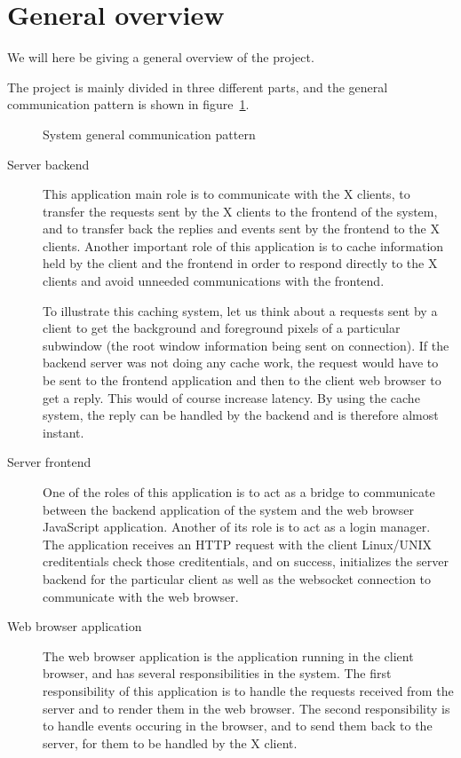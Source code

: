 \section{General overview}
We will here be giving a general overview of the project. 

The project is mainly divided in three different parts, and the general 
communication pattern is shown in figure~\ref{fig:project-overview}.
\begin{figure}[tb]
  \begin{center}
    
    \caption{\label{fig:project-overview}System general communication pattern}
  \end{center}
\end{figure}
\begin{description}
\item[Server backend]
  This application main role is to communicate with the X clients, 
  to transfer the requests sent by the X clients to the frontend of the system, 
  and to transfer back the replies and events sent by the frontend to the 
  X clients. 
% 
  Another important role of this application is to cache 
  information held by the client and the frontend in order to 
  respond directly to the X clients and avoid unneeded communications
  with the frontend.

%
  To illustrate this caching system, let us think about a requests sent by a 
  client to get the background and foreground pixels of a particular 
  subwindow (the root window information being sent on connection). If the 
  backend server was not doing any cache work, the request would have to be 
  sent to the frontend application and then to the client web browser to get 
  a reply. This would of course increase latency. By using the cache system,
  the reply can be handled by the backend and is therefore almost instant.
  
\item[Server frontend]
  One of the roles of this application  is to act as a bridge to
  communicate between the backend application of the system 
  and the web browser JavaScript application.
%
  Another of its role is to act as a login manager. The application 
  receives an HTTP request with the client Linux/UNIX creditentials 
  check those creditentials, and on success, initializes the server 
  backend for the particular client as well as the websocket connection 
  to communicate with the web browser.
\item[Web browser application]
  The web browser application is the application running in the client 
  browser, and has several responsibilities in the system.
%
  The first responsibility of this application is to handle the 
  requests received from the server and to render them in the web 
  browser.
%
  The second responsibility is to handle events occuring in the browser, and to 
  send them back to the server, for them to be handled by the X client.
\end{description}




